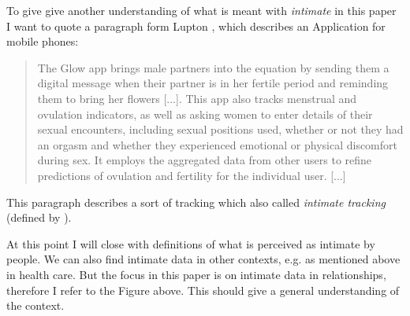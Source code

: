 To give give another understanding of what is meant with \textit{intimate} in this paper I want to quote a paragraph form Lupton \cite{doi:10.1080/13691058.2014.920528}, which describes an Application for mobile phones:
\begin{quote}
	The	Glow app brings male partners into the equation by sending them a digital
	message when their partner is in her fertile period and reminding them to bring her flowers	[...]. This app also tracks menstrual and ovulation indicators, as well as asking women to enter details of their sexual encounters, including sexual positions used, whether or not they had an orgasm and whether they experienced emotional or physical discomfort during sex. It employs the aggregated data from other users to refine predictions of ovulation and fertility for the individual user. [...]
\end{quote}
This paragraph describes a sort of tracking which also called \textit{intimate tracking} (defined by \cite{doi:10.1080/15265161.2017.1409823}).

At this point  I will close with definitions of what is perceived as intimate by people. We can also find intimate data in other contexts, e.g. as mentioned above in health care. But the focus in this paper is on intimate data in relationships, therefore I refer to the Figure above. This should give a general understanding of the context. 
